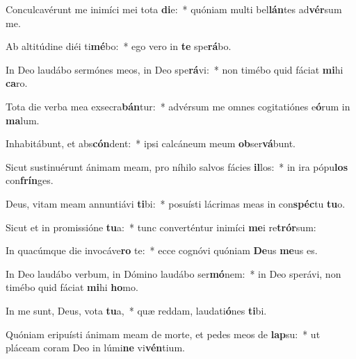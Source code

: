 \item Conculcavérunt me inimíci mei tota \textbf{di}e:~* quóniam multi bel\textbf{lán}tes ad\textbf{vér}sum me.
\item Ab altitúdine diéi ti\textbf{mé}bo:~* ego vero in \textbf{te} spe\textbf{rá}bo.
\item In Deo laudábo sermónes meos, in Deo spe\textbf{rá}vi:~* non timébo quid fáciat \textbf{mi}hi \textbf{ca}ro.
\item Tota die verba mea exsecra\textbf{bán}tur:~* advérsum me omnes cogitatiónes e\textbf{ó}rum in \textbf{ma}lum.
\item Inhabitábunt, et abs\textbf{cón}dent:~* ipsi calcáneum meum \textbf{ob}ser\textbf{vá}bunt.
\item Sicut sustinuérunt ánimam meam, pro níhilo salvos fácies \textbf{il}los:~* in ira pópu\textbf{los} con\textbf{frín}ges.
\item Deus, vitam meam annuntiávi \textbf{ti}bi:~* posuísti lácrimas meas in con\textbf{spéc}tu \textbf{tu}o.
\item Sicut et in promissióne \textbf{tu}a:~* tunc converténtur inimíci \textbf{me}i re\textbf{trór}sum:
\item In quacúmque die invocáve\textbf{ro} te:~* ecce cognóvi quóniam \textbf{De}us \textbf{me}us es.
\item In Deo laudábo verbum, in Dómino laudábo ser\textbf{mó}nem:~* in Deo sperávi, non timébo quid fáciat \textbf{mi}hi \textbf{ho}mo.
\item In me sunt, Deus, vota \textbf{tu}a,~* quæ reddam, laudati\textbf{ó}nes \textbf{ti}bi.
\item Quóniam eripuísti ánimam meam de morte, et pedes meos de \textbf{lap}su:~* ut pláceam coram Deo in lúmi\textbf{ne} vi\textbf{vén}tium.
